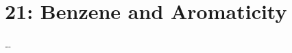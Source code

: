 \chapter{21: Benzene and Aromaticity}\label{21: Benzene and Aromaticity}
\begin{adjustwidth}{1cm}{1cm}
  \dots
\end{adjustwidth}


